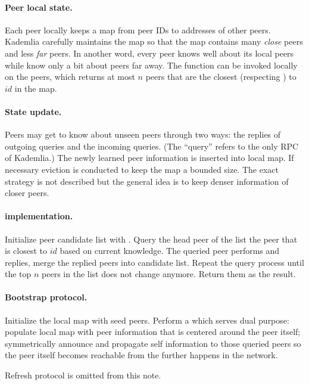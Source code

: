 \paragraph{Peer local state.}
Each peer locally keeps a map from peer IDs to addresses of other peers.
Kademlia carefully maintains the map so that the map contains many \emph{close} peers and less \emph{far} peers.
In another word, every peer knows well about its local peers while know only a bit about peers far away.
The function \lfind[$id$, $n$] can be invoked locally on the peers, which returns at most $n$ peers that are the closest (respecting \dist) to $id$ in the map.

\paragraph{State update.}
Peers may get to know about unseen peers through two ways: the replies of outgoing queries and the incoming queries.
(The ``query'' refers to the only RPC of Kademlia.)
The newly learned peer information is inserted into local map.
If necessary eviction is conducted to keep the map a bounded size.
The exact strategy is not described but the general idea is to keep denser information of closer peers.

\paragraph{\find[$id$, $n$] implementation.}
Initialize peer candidate list with \lfind[$id$, $n$].
Query the head peer of the list \ie the peer that is closest to $id$ based on current knowledge.
The queried peer performs \lfind[$id$, $n$] and replies, merge the replied peers into candidate list.
Repeat the query process until the top $n$ peers in the list does not change anymore.
Return them as the \find result.

\paragraph{Bootstrap protocol.}
Initialize the local map with seed peers.
Perform a \find[self ID, $n$] which serves dual purpose: populate local map with peer information that is centered around the peer itself; symmetrically announce and propagate self information to those queried peers so the peer itself becomes reachable from the further \find happens in the network.

Refresh protocol is omitted from this note.